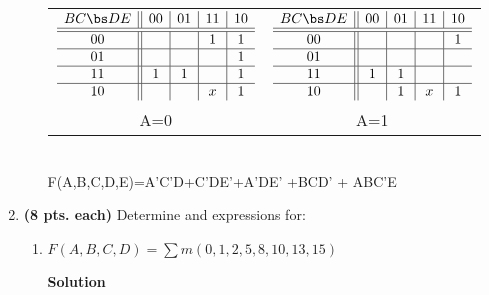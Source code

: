 \begin{enumerate}
\begin{enumerate}
\begin{onlysolution}
{\begin{tabular}{cc}
$\begin{array} {c||c|c|c|c}
   B C \bs D E   & 00 & 01 & 11 & 10 \\ \hline \hline
       00        &    &    & 1  & 1  \\ \hline
       01        &    &    &    & 1  \\ \hline
       11        & 1  & 1  &    & 1  \\ \hline
       10        &    &    & x  & 1  \\
\end{array}$ &
$\begin{array} {c||c|c|c|c}
   B C \bs D E   & 00 & 01 & 11 & 10 \\ \hline \hline
       00        &    &    &    & 1  \\ \hline
       01        &    &    &    &    \\ \hline
       11        & 1  & 1  &    &    \\ \hline
       10        &    & 1  & x  & 1  \\
\end{array}$ \\
A=0 & A=1 \\
\end{tabular} \\
F(A,B,C,D,E)=A'C'D+C'DE'+A'DE' +BCD' + ABC'E 
} \end{onlysolution} 

\end{enumerate}

\item \textbf{ (8 pts. each)} Determine \SOPmin and \POSmin expressions for:
\begin{enumerate}
\item  $F(A,B,C,D) = \sum m(0,1,2,5,8,10,13,15)$

\begin{onlysolution}  \textbf{Solution} \itshape{

}
\end{onlysolution}
\end{enumerate}
\end{enumerate}

